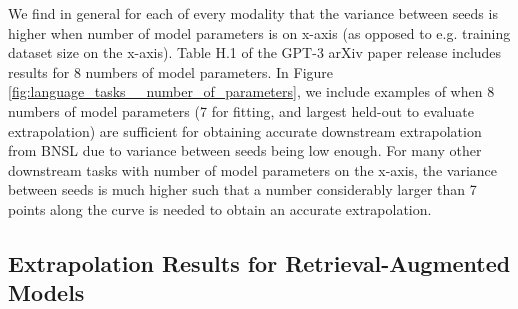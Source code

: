 \documentclass{article} %
\begin{document}
We find in general for each of every modality that the variance between seeds is higher when number of model parameters is on x-axis (as opposed to e.g. training dataset size on the x-axis). Table H.1 of the GPT-3 arXiv paper \citep{brown2020language} release includes results for 8 numbers of model parameters. In Figure \ref{fig:language_tasks__number_of_parameters}, we include examples of when 8 numbers of model parameters (7 for fitting, and largest held-out to evaluate extrapolation) are sufficient for obtaining accurate downstream extrapolation from BNSL due to variance between seeds being low enough. For many other downstream tasks with number of model parameters on the x-axis, the variance between seeds is much higher such that a number considerably larger than 7 points along the curve is needed to obtain an accurate extrapolation.

\clearpage

\subsection{Extrapolation Results for Retrieval-Augmented Models}
\label{section:retrieval}

\vspace{-3.5mm}
\end{document}
